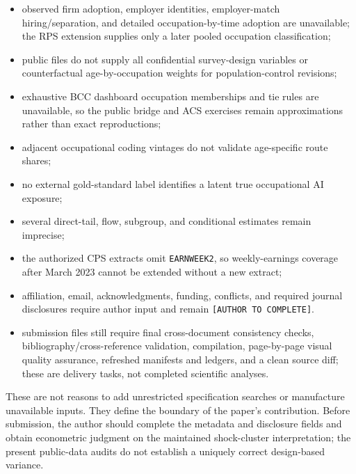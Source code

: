 \documentclass[11pt,letterpaper]{article}
\begin{document}
\begin{itemize}[leftmargin=1.8em]
\item observed firm adoption, employer identities, employer-match hiring/separation, and detailed occupation-by-time adoption are unavailable; the RPS extension supplies only a later pooled occupation classification;
\item public files do not supply all confidential survey-design variables or counterfactual age-by-occupation weights for population-control revisions;
\item exhaustive BCC dashboard occupation memberships and tie rules are unavailable, so the public bridge and ACS exercises remain approximations rather than exact reproductions;
\item adjacent occupational coding vintages do not validate age-specific route shares;
\item no external gold-standard label identifies a latent true occupational AI exposure;
\item several direct-tail, flow, subgroup, and conditional estimates remain imprecise;
\item the authorized CPS extracts omit \texttt{EARNWEEK2}, so weekly-earnings coverage after March 2023 cannot be extended without a new extract;
\item affiliation, email, acknowledgments, funding, conflicts, and required journal disclosures require author input and remain \texttt{[AUTHOR TO COMPLETE]}.
\item submission files still require final cross-document consistency checks, bibliography/cross-reference validation, compilation, page-by-page visual quality assurance, refreshed manifests and ledgers, and a clean source diff; these are delivery tasks, not completed scientific analyses.
\end{itemize}

These are not reasons to add unrestricted specification searches or manufacture unavailable inputs.  They define the boundary of the paper's contribution.  Before submission, the author should complete the metadata and disclosure fields and obtain econometric judgment on the maintained shock-cluster interpretation; the present public-data audits do not establish a uniquely correct design-based variance.
\end{document}
